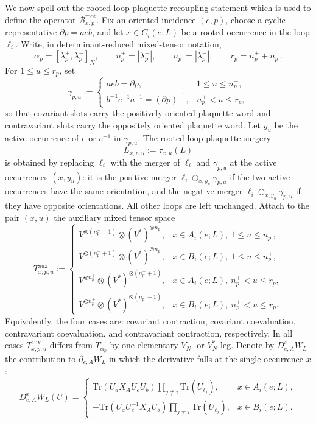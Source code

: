 \documentclass[11pt,a4paper,reqno]{amsart}
\theoremstyle{definition}
\theoremstyle{remark}
\newcommand\Tr{{\mathrm{Tr}}}
\begin{document}
We now spell out the rooted loop-plaquette recoupling statement which is used to define the operator $\mathscr B^{\mathrm{root}}_{x,p}$. Fix an oriented incidence $(e,p)$, choose a cyclic representative $\partial p=aeb$, and let $x\in C_i(e;L)$ be a rooted occurrence in the loop $\ell_i$.  Write, in determinant-reduced mixed-tensor notation,
\[
\alpha_p=[\lambda_p^+,\lambda_p^-]_N,
\qquad
n_p^+=|\lambda_p^+|,
\qquad
n_p^-=|\lambda_p^-|,
\qquad
r_p=n_p^++n_p^- .
\]
For $1\le u\le r_p$, set
\[
\gamma_{p,u}:=
\begin{cases}
aeb=\partial p, & 1\le u\le n_p^+,\\[1mm]
b^{-1}e^{-1}a^{-1}=(\partial p)^{-1}, & n_p^+<u\le r_p,
\end{cases}
\]
so that covariant slots carry the positively oriented plaquette word and contravariant slots carry the oppositely oriented plaquette word.  Let $y_u$ be the active occurrence of $e$ or $e^{-1}$ in $\gamma_{p,u}$.  The rooted loop-plaquette surgery
\[
L_{x,p,u}:=\tau_{x,u}(L)
\]
is obtained by replacing $\ell_i$ with the merger of $\ell_i$ and $\gamma_{p,u}$ at the active occurrences $(x,y_u)$: it is the positive merger $\ell_i\oplus_{x,y_u}\gamma_{p,u}$ if the two active occurrences have the same orientation, and the negative merger $\ell_i\ominus_{x,y_u}\gamma_{p,u}$ if they have opposite orientations.  All other loops are left unchanged. Attach to the pair $(x,u)$ the auxiliary mixed tensor space
\[
T^{\mathrm{aux}}_{x,p,u}:=
\begin{cases}
V^{\otimes(n_p^+-1)}\otimes (V^*)^{\otimes n_p^-},
& x\in A_i(e;L),\ 1\le u\le n_p^+,\\[1mm]
V^{\otimes(n_p^++1)}\otimes (V^*)^{\otimes n_p^-},
& x\in B_i(e;L),\ 1\le u\le n_p^+,\\[1mm]
V^{\otimes n_p^+}\otimes (V^*)^{\otimes(n_p^-+1)},
& x\in A_i(e;L),\ n_p^+<u\le r_p,\\[1mm]
V^{\otimes n_p^+}\otimes (V^*)^{\otimes(n_p^--1)},
& x\in B_i(e;L),\ n_p^+<u\le r_p.
\end{cases}
\]
Equivalently, the four cases are: covariant contraction, covariant coevaluation, contravariant coevaluation, and contravariant contraction, respectively. In all cases $T^{\mathrm{aux}}_{x,p,u}$ differs from $T_{\alpha_p}$ by one elementary $V_N$- or $V_N^*$-leg. Denote by $D^x_{e,A}W_L$ the contribution to $\partial_{e,A}W_L$ in which the derivative falls at the single occurrence $x$:
\[
D^x_{e,A}W_L(U)=
\begin{cases}
\displaystyle
\Tr(U_aX_AU_eU_b)\prod_{j\neq i}\Tr(U_{\ell_j}),
& x\in A_i(e;L),\\[2mm]
\displaystyle
-\Tr(U_aU_e^{-1}X_AU_b)\prod_{j\neq i}\Tr(U_{\ell_j}),
& x\in B_i(e;L).
\end{cases}
\]
\end{document}
